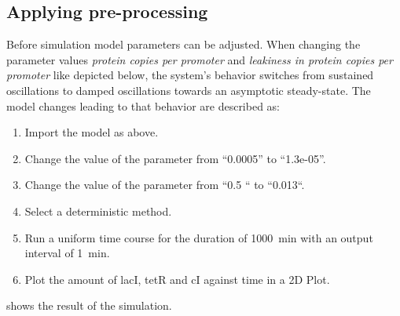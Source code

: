 \subsection{Applying pre-processing}
\label{sec:preprocessing}
Before simulation model parameters can be adjusted. When changing the parameter values \emph{protein copies per promoter}  and \emph{leakiness in protein copies per promoter}  like depicted below, the system's behavior switches from sustained oscillations to damped oscillations towards an asymptotic steady-state. The model changes leading to that behavior are described as: 

\begin{enumerate}
	\item{Import the model as above.}
	\item{Change the value of the parameter  from “0.0005” to “1.3e-05”.}
	\item{Change the value of the parameter  from “0.5 “ to “0.013“.}
	\item{Select a deterministic method.}
	\item{Run a uniform time course for the duration of 1000~min with an output interval of 1~min.}
	\item Plot the amount of lacI, tetR and cI against time in a 2D Plot.
\end{enumerate}

 shows the result of the simulation.

